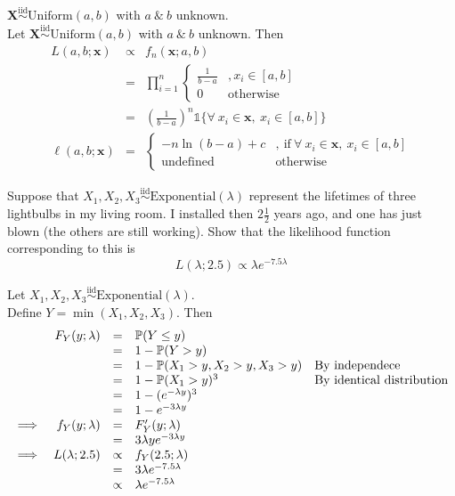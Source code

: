 \documentclass[11pt,a4paper]{article}
\begin{document}
\qpartnb $\textbf{X}\overset{\mathrm{iid}}{\sim}\mathrm{Uniform}(a,b)$ with $a\ \&\ b$ unknown.\\

\apart
Let $\textbf{X}\overset{\mathrm{iid}}{\sim}\mathrm{Uniform}(a,b)$ with $a\ \&\ b$ unknown. Then
\[\begin{array}{rcl}
L(a,b;\textbf{x})&\propto&f_n(\textbf{x};a,b)\\
&=&\prod\limits_{i=1}^n\begin{cases}
\frac{1}{b-a}&,x_i\in[a,b]\\
0&\text{otherwise}
\end{cases}\\
&=&\left(\frac{1}{b-a}\right)^n\mathds{1}\{\forall\ x_i\in\textbf{x},\ x_i\in[a,b]\}\\
\ell(a,b;\textbf{x})&=&\begin{cases}
-n\ln(b-a)+c&,\ \mathrm{if}\ \forall\ x_i\in\textbf{x},\ x_i\in[a,b]\\
\text{undefined}&\text{otherwise}
\end{cases}
\end{array}\]

\question
Suppose that $X_1,X_2,X_3\overset{\mathrm{iid}}{\sim}\mathrm{Exponential}(\lambda)$ represent the lifetimes of three lightbulbs in my living room. I installed then $2\frac{1}{2}$ years ago, and one has just blown (the others are still working). Show that the likelihood function corresponding to this is
$$L(\lambda;2.5)\propto\lambda e^{-7.5\lambda}$$

\ans
Let $X_1,X_2,X_3\overset{\mathrm{iid}}{\sim}\mathrm{Exponential}(\lambda)$.\\
Define $Y=\min(X_1,X_2,X_3)$. Then
\[\begin{array}{rrcll}
&F_Y(y;\lambda)&=&\mathbb{P}(Y\leq y)\\
&&=&1-\mathbb{P}(Y>y)\\
&&=&1-\mathbb{P}(X_1>y,X_2>y,X_3>y)&\text{By independece}\\
&&=&1-\mathbb{P}(X_1>y)^3&\text{By identical distribution}\\
&&=&1-(e^{-\lambda y})^3\\
&&=&1-e^{-3\lambda y}\\
\implies&f_Y(y;\lambda)&=&F_Y'(y;\lambda)\\
&&=&3\lambda ye^{-3\lambda y}\\
\implies&L(\lambda;2.5)&\propto&f_Y(2.5;\lambda)\\
&&=&3\lambda e^{-7.5\lambda}\\
&&\propto&\lambda e^{-7.5\lambda}
\end{array}\]
\end{document}
